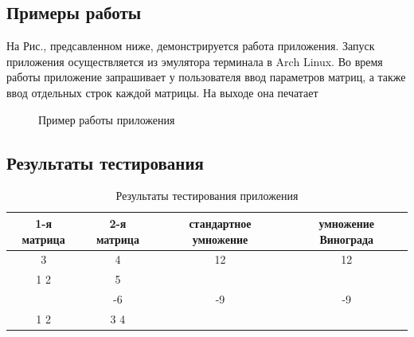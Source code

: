 \documentclass[a4paper,12pt]{article}
\begin{document}
\newpage
\subsection{Примеры работы}
\begin{flushleft}
На Рис., предсавленном ниже, демонстрируется работа приложения. Запуск приложения осуществляется из эмулятора терминала в Arch Linux. Во время работы приложение запрашивает у пользователя ввод параметров матриц, а также ввод отдельных строк каждой матрицы. На выходе она печатает
\end{flushleft}
\begin{figure}[h]
\caption{Пример работы приложения}
\label{images:example}
\end{figure}

\newpage
\subsection{Результаты тестирования}

\begin{table}[h]
\caption{\label{tablice:tests}Результаты тестирования приложения}
\begin{center}
\begin{tabular}{|c|c|c|c|}
\hline
1-я матрица & 2-я матрица & стандартное умножение & умножение Винограда \\
\hline
3 & 4 & 12 & 12 \\
\hline
1 2 & 5 & & \\
 & -6 & -9 & -9 \\
\hline
1 2 & 3 4 & & 
\end{tabular}
\end{center}
\end{table}
\end{document}
